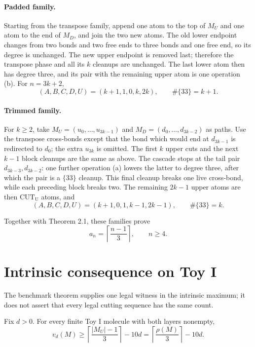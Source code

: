 \documentclass[12pt]{article}
\newcommand{\good}{\#\{33\}}
\newcommand{\MU}{M_U}
\newcommand{\MD}{M_D}
\newcommand{\CUTU}{\operatorname{CUT_U}}
\begin{document}
\paragraph{Padded family.}
Starting from the transpose family, append one atom to the top of \(\MU\) and
one atom to the end of \(\MD\), and join the two new atoms.  The old lower
endpoint changes from two bonds and two free ends to three bonds and one free
end, so its degree is unchanged.  The new upper endpoint is removed last;
therefore the transpose phase and all its \(k\) cleanups are unchanged.  The
last lower atom then has degree three, and its pair with the remaining upper
atom is one operation (b).  For \(n=3k+2\),
\[
 (A,B,C,D,U)=(k+1,1,0,k,2k),\qquad \good=k+1.
\]

\paragraph{Trimmed family.}
For \(k\ge2\), take \(\MU=(u_0,\ldots,u_{3k-1})\) and
\(\MD=(d_0,\ldots,d_{3k-2})\) as paths.  Use the transpose cross-bonds except
that the bond which would end at \(d_{3k-1}\) is redirected to \(d_0\); the
extra \(u_{3k}\) is omitted.  The first \(k\) upper cuts and the next
\(k-1\) block cleanups are the same as above.  The cascade stops at the tail
pair \(d_{3k-3},d_{3k-2}\): one further operation (a) lowers the latter to
degree three, after which the pair is a \(\{33\}\) cleanup.  This final cleanup
breaks one live cross-bond, while each preceding block breaks two.  The
remaining \(2k-1\) upper atoms are then \(\CUTU\) atoms, and
\[
 (A,B,C,D,U)=(k+1,0,1,k-1,2k-1),\qquad \good=k.
\]

Together with Theorem 2.1, these families prove
\begin{equation}
 a_n=\left\lceil\frac{n-1}{3}\right\rceil,\qquad n\ge4. \tag{3.1}
\end{equation}

\section{Intrinsic consequence on Toy I}\label{sec:intrinsic}

The benchmark theorem supplies one legal witness in the intrinsic maximum; it
does not assert that every legal cutting sequence has the same count.

\begin{proposition}
Fix \(d>0\).  For every finite Toy I molecule with both layers nonempty,
\begin{equation}
 v_d(M)\ge\left\lceil\frac{|\MU|-1}{3}\right\rceil-10d
 =\left\lceil\frac{\rho(M)}3\right\rceil-10d. \tag{4.1}
\end{equation}
\end{proposition}
\end{document}
